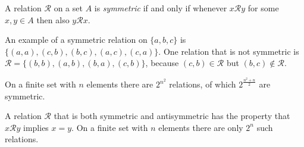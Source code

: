\documentclass{article}
\begin{document}

A relation $\mathcal{R}$ on a set $A$ is \emph{symmetric} if and only if
whenever $x\mathcal{R}y$ for some $x, y \in A$ then also $y\mathcal{R}x$.

An example of a symmetric relation on $\{a,b,c\}$
is $\{(a,a), (c,b), (b,c), (a,c), (c,a)\}$.
One relation that is not symmetric is
$\mathcal{R} = \{(b,b), (a,b), (b,a), (c,b) \} $,
because $(c,b) \in \mathcal{R}$ but $(b,c) \notin \mathcal{R}$.

On a finite set with $n$ elements there are $2^{n^2}$ relations,
of which $2^{\frac{n^2+n}{2}}$ are symmetric.

A relation $\mathcal{R}$ that is both symmetric and antisymmetric
has the property that $x\mathcal{R}y$ implies $x=y$.
On a finite set with $n$ elements there are only $2^n$ such relations.
\end{document}
